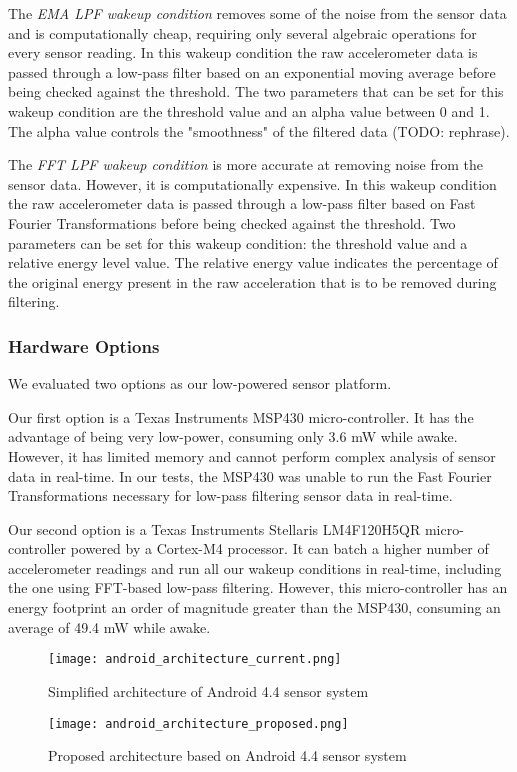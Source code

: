 The \emph{EMA LPF wakeup condition} removes some of the noise from the sensor data and is computationally cheap, requiring only several algebraic operations for every sensor reading. In this wakeup condition the raw accelerometer data is passed through a low-pass filter based on an exponential moving average before being checked against the threshold. The two parameters that can be set for this wakeup condition are the threshold value and an alpha value between 0 and 1. The alpha value controls the "smoothness" of the filtered data (TODO: rephrase).

The \emph{FFT LPF wakeup condition} is more accurate at removing noise from the sensor data. However, it is computationally expensive. In this wakeup condition the raw accelerometer data is passed through a low-pass filter based on Fast Fourier Transformations before being checked against the threshold. Two parameters can be set for this wakeup condition: the threshold value and a relative energy level value. The relative energy value indicates the percentage of the original energy present in the raw acceleration that is to be removed during filtering.  

\subsubsection{Hardware Options}

We evaluated two options as our low-powered sensor platform. 

Our first option is a Texas Instruments MSP430 micro-controller. It has the advantage of being very low-power, consuming only 3.6 mW while awake. However, it has limited memory and cannot perform complex analysis of sensor data in real-time. In our tests, the MSP430 was unable to run the Fast Fourier Transformations necessary for low-pass filtering sensor data in real-time. 

Our second option is a Texas Instruments Stellaris LM4F120H5QR micro-controller powered by a Cortex-M4 processor. It can batch a higher number of accelerometer readings and run all our wakeup conditions in real-time, including the one using FFT-based low-pass filtering. However, this micro-controller has an energy footprint an order of magnitude greater than the MSP430, consuming an average of 49.4 mW while awake.



\begin{figure}[h]
	\texttt{[image: android\_architecture\_current.png]}
	\caption{Simplified architecture of Android 4.4 sensor system}
    \label{fig:androidArchCurrent}
\end{figure}

\begin{figure}[h]
	\texttt{[image: android\_architecture\_proposed.png]}
	\caption{Proposed architecture based on Android 4.4 sensor system}
    \label{fig:androidArchProposed}
\end{figure}